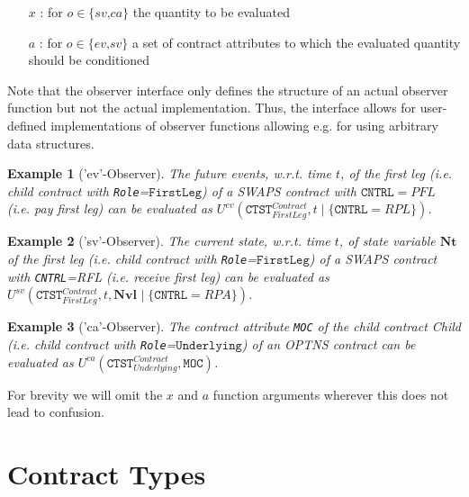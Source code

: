 \documentclass[9pt,oneside]{amsart}
\newtheorem{example}{Example}
\newcommand{\svar}[2]{\textbf{#1}_{#2}}
\newcommand{\attr}[1]{\texttt{#1}}
\newcommand{\cldev}[3]{U^{ev}(#1,#2 \mid\{#3\})}
\newcommand{\cldsv}[4]{U^{sv}(#1,#2,\svar{#3}{} \mid\{#4\})}
\newcommand{\cldca}[2]{U^{ca}(#1,#2)}
\begin{document}
\begin{multicols}{2}
\begin{itemize}
	\item [$x$]: for $o\in\{\textit{sv,ca}\}$ the quantity to be evaluated

	\item [$a$]: for $o\in\{\textit{ev,sv}\}$ a set of contract attributes to which the evaluated quantity should be conditioned
\end{itemize}


Note that the observer interface only defines the structure of an actual observer function but not the actual implementation. Thus, the interface allows for user-defined implementations of observer functions allowing e.g. for using arbitrary data structures.

\begin{example}['ev'-Observer] The future events, w.r.t. time $t$, of the \textit{first leg} (i.e. child contract with \verb'Role'=$\texttt{FirstLeg}$) of a SWAPS contract with $\attr{CNTRL}=PFL$ (i.e. \textit{pay first leg}) can be evaluated as $\cldev{\attr{CTST}_{FirstLeg}^{Contract}}{t}{\attr{CNTRL}=RPL}$.
\end{example}

\begin{example}['sv'-Observer] The current state, w.r.t. time $t$, of state variable $\svar{Nt}{}$ of the \textit{first leg} (i.e. child contract with \verb'Role'=$\texttt{FirstLeg}$) of a SWAPS contract with \attr{CNTRL}=RFL (i.e. \textit{receive first leg}) can be evaluated as $\cldsv{\attr{CTST}_{FirstLeg}^{Contract}}{t}{Nvl}{\attr{CNTRL}=RPA}$.
\end{example}

\begin{example}['ca'-Observer] The contract attribute \attr{MOC} of the child contract \textit{Child} (i.e. child contract with \verb'Role'=$\texttt{Underlying}$) of an OPTNS contract can be evaluated as $\cldca{\attr{CTST}_{Underlying}^{Contract}}{\attr{MOC}}$.
\end{example}

For brevity we will omit the $x$ and $a$ function arguments wherever this does not lead to confusion.




\end{multicols}

\newpage

\section{Contract Types}\label{sec:contracts}
\end{document}
